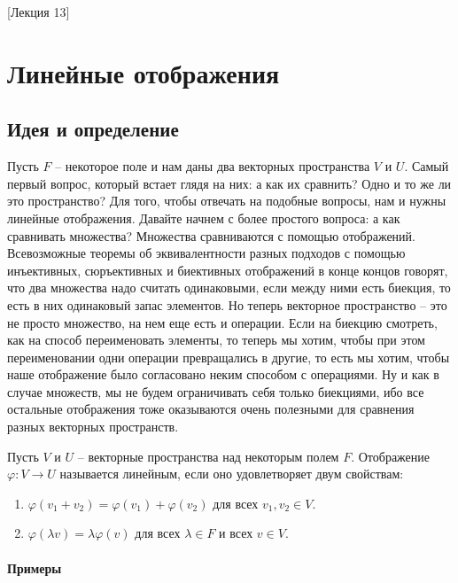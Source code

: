 [Лекция 13]


\newpage
\section{Линейные отображения}

\subsection{Идея и определение}

Пусть $F$ -- некоторое поле и нам даны два векторных пространства $V$ и $U$.
Самый первый вопрос, который встает глядя на них: а как их сравнить?
Одно и то же ли это пространство?
Для того, чтобы отвечать на подобные вопросы, нам и нужны линейные отображения.
Давайте начнем с более простого вопроса: а как сравнивать множества?
Множества сравниваются с помощью отображений.
Всевозможные теоремы об эквивалентности разных подходов с помощью инъективных, сюръективных и биективных отображений в конце концов говорят, что два множества надо считать одинаковыми, если между ними есть биекция, то есть в них одинаковый запас элементов.
Но теперь векторное пространство -- это не просто множество, на нем еще есть и операции.
Если на биекцию смотреть, как на способ переименовать элементы, то теперь мы хотим, чтобы при этом переименовании одни операции превращались в другие, то есть мы хотим, чтобы наше отображение было согласовано неким способом с операциями.
Ну и как в случае множеств, мы не будем ограничивать себя только биекциями, ибо все остальные отображения тоже оказываются очень полезными для сравнения разных векторных пространств.

\begin{definition}
Пусть $V$ и $U$ -- векторные пространства над некоторым полем $F$.
Отображение $\varphi\colon V\to U$ называется линейным, если оно удовлетворяет двум свойствам:
\begin{enumerate}
\item $\varphi(v_1 + v_2) = \varphi(v_1) + \varphi(v_2)$ для всех $v_1,v_2\in V$.

\item $\varphi(\lambda v) = \lambda \varphi(v)$ для всех $\lambda \in F$ и всех $v\in V$.
\end{enumerate}
\end{definition}

\paragraph{Примеры}

